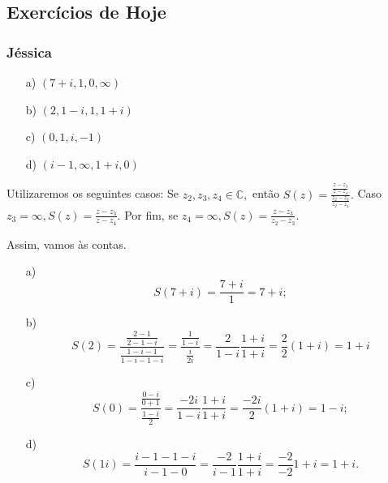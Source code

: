 \documentclass{article}
\begin{document}
\subsection{Exerc\'icios de Hoje }
\subsubsection{J\'essica}
\begin{itemize}
  \item[a)] $(7+i, 1, 0, \infty)$
  \item[b)] $(2, 1-i, 1, 1+i)$
  \item[c)] $(0, 1, i, -1)$
  \item[d)] $(i-1, \infty, 1+i, 0)$
\end{itemize}
  Utilizaremos os seguintes casos: Se $z_{2}, z_{3}, z_{4}\in \mathbb{C},$ ent\~ao $S(z) = \displaystyle \frac{\frac{z-z_{3}}{z-z_{4}}}{\frac{z_{2} - z_{3}}{z_{2} - z_{4}}}.$
Caso $z_{3} = \infty, \displaystyle S(z) = \frac{z - z_{3}}{z - z_{4}}.$ Por fim, se $z_{4} = \infty, S(z) = \displaystyle \frac{z - z_{3}}{z_{2} - z_{3}}.$ 
  
  Assim, vamos \`as contas.
 \begin{itemize}
   \item[a)] $$S(7 + i) = \frac{7 + i}{1} = 7 + i;$$
   \item[b)] $$S(2) = \frac{\frac{2 -1}{2 - 1 - i}}{\frac{1 - i - 1}{1 - i - 1 - i}} = \frac{\frac{1}{1-i}}{\frac{i}{2i}} = \frac{2}{1-i}\frac{1+i}{1+i} = \frac{2}{2}(1 + i) = 1 + i$$
   \item[c)] $$S(0) = \frac{\frac{0-i}{0+1}}{\frac{1-i}{2}} = \frac{-2i}{1-i}\frac{1+i}{1+i} = \frac{-2i}{2}(1+i) = 1-i;$$
   \item[d)] $$S(1i) = \frac{i-1-1-i}{i-1-0} = \frac{-2}{i-1}\frac{1+i}{1+i} = \frac{-2}{-2}1+i = 1+i.$$
 \end{itemize}
\end{document}
